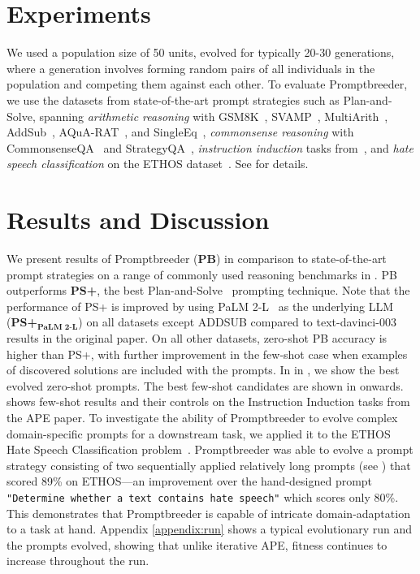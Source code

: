 \documentclass{article} %
\newcommand{\prompt}[1]{\footnotesize{\texttt{"#1"}}\normalsize}
\begin{document}
\section{Experiments}
\label{sec:experiments}
We used a population size of 50 units, evolved for typically 20-30 generations, where a generation involves forming random pairs of all individuals in the population and competing them against each other. To evaluate Promptbreeder, we use the datasets from state-of-the-art prompt strategies such as Plan-and-Solve, spanning \emph{arithmetic reasoning} with GSM8K~\citep{DBLP:journals/corr/abs-2110-14168}, SVAMP~\citep{DBLP:conf/naacl/PatelBG21}, 
MultiArith~\citep{roy2016solving}, 
AddSub~\citep{hosseini-etal-2014-learning},
AQuA-RAT~\citep{ling-etal-2017-program}, and SingleEq~\citep{koncel-kedziorski-etal-2015-parsing},
\emph{commonsense reasoning} with CommonsenseQA~\citep[CSQA,][]{talmor-etal-2019-commonsenseqa} and  StrategyQA~\citep[SQA,][]{DBLP:journals/tacl/GevaKSKRB21},
\emph{instruction induction} tasks from~\citep{DBLP:conf/acl/Honovich0BL23},
and \emph{hate speech classification} on the ETHOS dataset~\citep{Mollas_2022}. See  for details. 

\section{Results and Discussion}

We present results of Promptbreeder (\textbf{PB}) in comparison to state-of-the-art prompt strategies on a range of commonly used reasoning benchmarks in .
PB outperforms \textbf{PS+}, the best Plan-and-Solve~\citep{DBLP:conf/acl/WangXLHLLL23} prompting technique. 
Note that the performance of PS+ is improved by using PaLM 2-L~\citep{anil2023palm} as the underlying LLM (\textbf{PS+}$_\textbf{PaLM 2-L}$) on all datasets except ADDSUB compared to text-davinci-003 results in the original paper. On all other datasets, zero-shot PB accuracy is higher than PS+, with further improvement in the few-shot case when examples of discovered solutions are included with the prompts.
In  in , we show the best evolved zero-shot prompts. The best few-shot candidates are shown in  onwards. %
 shows few-shot results and their controls on the Instruction Induction tasks from the APE paper. 
To investigate the ability of Promptbreeder to evolve complex domain-specific prompts for a downstream task, we applied it to the ETHOS Hate Speech Classification problem~\citep{Mollas_2022}. Promptbreeder was able to evolve a prompt strategy consisting of two sequentially applied relatively long prompts (see ) that scored 89\% on ETHOS---an improvement over the hand-designed prompt \prompt{Determine whether a text contains hate speech} which scores only 80\%. This demonstrates that Promptbreeder is capable of intricate domain-adaptation to a task at hand. Appendix \ref{appendix:run} shows a typical evolutionary run and the prompts evolved, showing that unlike iterative APE, fitness continues to increase throughout the run. 
\end{document}
